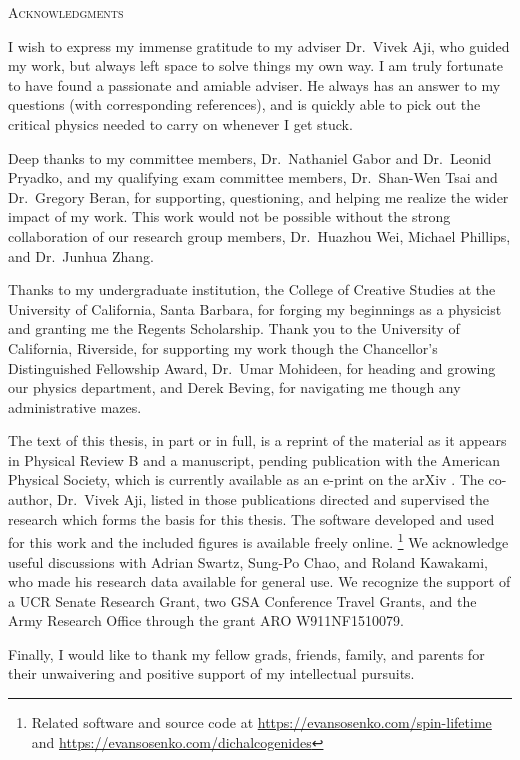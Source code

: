 \clearpage
\centering
\vspace*{-\toptafiddle}

\textsc{Acknowledgments}

\justify{}
\DoubleSpacing{}
I wish to express my immense gratitude to my adviser Dr.\ Vivek Aji,
who guided my work, but always left space to solve things my own way.
I am truly fortunate to have found a passionate and amiable adviser.
He always has an answer to my questions (with corresponding references),
and is quickly able to pick out the critical physics
needed to carry on whenever I get stuck.

Deep thanks to my committee members,
Dr.\ Nathaniel Gabor and Dr.\ Leonid Pryadko,
and my qualifying exam committee members,
Dr.\ Shan-Wen Tsai and Dr.\ Gregory Beran,
for supporting, questioning,
and helping me realize the wider impact of my work.
This work would not be possible without the strong collaboration
of our research group members, Dr.\ Huazhou Wei, Michael Phillips,
and Dr.\ Junhua Zhang.

Thanks to my undergraduate institution,
the College of Creative Studies at
the University of California, Santa Barbara,
for forging my beginnings as a physicist
and granting me the Regents Scholarship.
Thank you to the University of California, Riverside,
for supporting my work though the
Chancellor's Distinguished Fellowship Award,
Dr.\ Umar Mohideen, for heading and growing our physics department,
and Derek Beving, for navigating me though any administrative mazes.

The text of this thesis, in part or in full,
is a reprint of the material as it appears in
Physical Review B
\cite{PhysRevB.89.245436}
and a manuscript, pending publication with the American Physical Society,
which is currently available as an e-print on the arXiv
\cite{1512.01261v2}.
The co-author, Dr.\ Vivek Aji, listed in those publications
directed and supervised the research which forms the basis for this thesis.
The software developed
and used
\cite{Hunter:2007} for this work
and the included figures is available freely online.%
\footnote{%
  Related software and source code at
  \url{https://evansosenko.com/spin-lifetime}
  and \url{https://evansosenko.com/dichalcogenides}
}
We acknowledge useful discussions with
Adrian Swartz, Sung-Po Chao, and Roland Kawakami,
who made his research data available for general use.
We recognize the support of a UCR Senate Research Grant,
two GSA Conference Travel Grants,
and the Army Research Office through the grant
ARO W911NF1510079.

Finally, I would like to thank my fellow grads, friends, family, and parents
for their unwaivering and positive support of my intellectual pursuits.
\enlargethispage{\bottafiddle}
\clearpage
